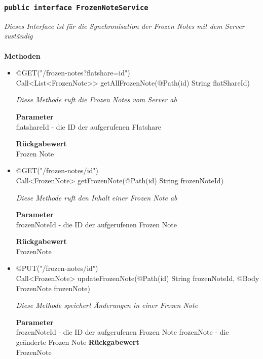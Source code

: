 	\subsubsection{\texttt{public interface FrozenNoteService }}
\textit{Dieses Interface ist für die Synchronisation der Frozen Notes mit dem Server zuständig}\\
\\
	\textbf{Methoden} \\
		\begin{itemize}
		\item{@GET("/frozen-notes?flatshare={id}")\\
Call<List<FrozenNote>> getAllFrozenNote(@Path(\grqq id\grqq) String flatShareId)}

		\textit{Diese Methode ruft die Frozen Notes vom Server ab}

		\textbf{Parameter} \\
	flatshareId -  die ID der aufgerufenen Flatshare  

		\textbf{Rückgabewert} \\
	Frozen Note

      \item{@GET("/frozen-notes/{id}")\\ Call<FrozenNote> getFrozenNote(@Path(\grqq id\grqq) String frozenNoteId)}

		\textit{Diese Methode ruft den Inhalt einer Frozen Note ab }

		\textbf{Parameter} \\
		frozenNoteId - die ID der aufgerufenen Frozen Note  

		\textbf{Rückgabewert} \\
	FrozenNote

	 \item{@PUT("/frozen-notes/{id}")\\ Call<FrozenNote> updateFrozenNote(@Path(\grqq id\grqq) String frozenNoteId, @Body FrozenNote frozenNote)}

		\textit{Diese Methode speichert Änderungen in einer Frozen Note}

		\textbf{Parameter} \\
		frozenNoteId - die ID der aufgerufenen Frozen Note  
		frozenNote - die geänderte Frozen Note
		\textbf{Rückgabewert} \\
	FrozenNote

	 \end{itemize}


